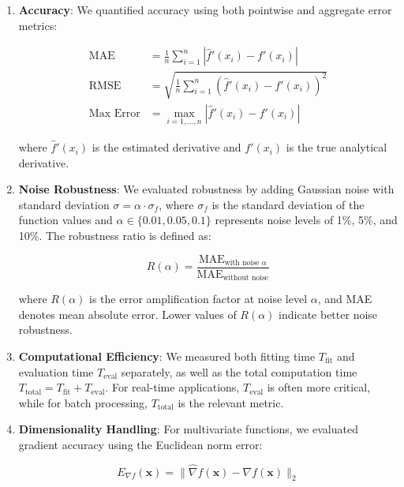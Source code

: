 \documentclass[10pt,journal,compsoc]{IEEEtran}
\begin{document}
\begin{enumerate}
    \item \textbf{Accuracy}: We quantified accuracy using both pointwise and aggregate error metrics:
    
    \begin{align}
        \text{MAE} &= \frac{1}{n}\sum_{i=1}^{n}|\hat{f}'(x_i) - f'(x_i)| \\[5pt]
        \text{RMSE} &= \sqrt{\frac{1}{n}\sum_{i=1}^{n}(\hat{f}'(x_i) - f'(x_i))^2} \\[5pt]
        \text{Max Error} &= \max_{i=1,\ldots,n}|\hat{f}'(x_i) - f'(x_i)|
    \end{align}
    
    where $\hat{f}'(x_i)$ is the estimated derivative and $f'(x_i)$ is the true analytical derivative.
    
    \item \textbf{Noise Robustness}: We evaluated robustness by adding Gaussian noise with standard deviation $\sigma = \alpha \cdot \sigma_f$, where $\sigma_f$ is the standard deviation of the function values and $\alpha \in \{0.01, 0.05, 0.1\}$ represents noise levels of 1\%, 5\%, and 10\%. The robustness ratio is defined as:
    
    \begin{equation}
        R(\alpha) = \frac{\text{MAE}_{\text{with noise } \alpha}}{\text{MAE}_{\text{without noise}}}
    \end{equation}
    
    where $R(\alpha)$ is the error amplification factor at noise level $\alpha$, and MAE denotes mean absolute error. Lower values of $R(\alpha)$ indicate better noise robustness.
    
    \item \textbf{Computational Efficiency}: We measured both fitting time $T_{\text{fit}}$ and evaluation time $T_{\text{eval}}$ separately, as well as the total computation time $T_{\text{total}} = T_{\text{fit}} + T_{\text{eval}}$. For real-time applications, $T_{\text{eval}}$ is often more critical, while for batch processing, $T_{\text{total}}$ is the relevant metric.
    
    \item \textbf{Dimensionality Handling}: For multivariate functions, we evaluated gradient accuracy using the Euclidean norm error:
    
    \begin{equation}
        E_{\nabla f}(\mathbf{x}) = \|\hat{\nabla}f(\mathbf{x}) - \nabla f(\mathbf{x})\|_2
    \end{equation}
    

\end{enumerate}
\end{document}
